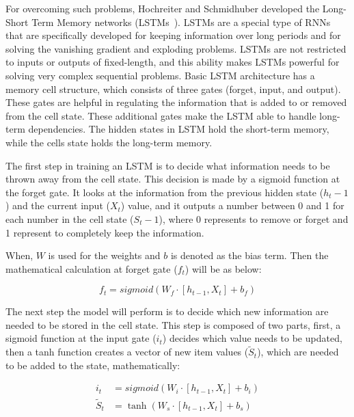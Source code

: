 For overcoming such problems, Hochreiter and Schmidhuber developed the Long-Short Term Memory networks (LSTMs~\cite{hochreiter1997long}).
LSTMs are a special type of RNNs that are specifically developed for keeping information over long periods and for solving the vanishing gradient and exploding problems.
LSTMs are not restricted to inputs or outputs of fixed-length, and this ability makes LSTMs powerful for solving very complex sequential problems. 
Basic LSTM architecture has a memory cell structure, which consists of three gates (forget, input, and output). 
These gates are helpful in regulating the information that is added to or removed from the cell state. These additional gates make the LSTM able to handle long-term dependencies. The hidden states in LSTM hold the short-term memory, while the cells state holds the long-term memory. 

The first step in training an LSTM is to decide what information needs to be thrown away from the cell state.
This decision is made by a sigmoid function at the forget gate.
It looks at the information from the previous hidden state ($h_t-1$) and the current input ($X_t$) value, and it outputs a number between 0 and 1 for each number in the cell state ($S_t-1$), where 0 represents to remove or forget and 1 represent to completely keep the information.

When, $W$ is used for the weights and $b$ is denoted as the bias term. 
Then the mathematical calculation at forget gate ($f_t$) will be as below:

\begin{equation}
f_{t}=sigmoid\left(W_{f} \cdot\left[h_{t-1}, X_{t}\right]+b_{f}\right)
\label{eq:eq1}
\end{equation}

The next step the model will perform is to decide which new information are needed to be stored in the cell state.
This step is composed of two parts, first, a sigmoid function at the input gate ($i_t$) decides which value needs to be updated, then a tanh function creates a vector of new item values ($\tilde{S}_{t}$), which are needed to be added to the state, mathematically:

\begin{equation}
\begin{aligned}
i_{t} &=sigmoid\left(W_{i} \cdot\left[h_{t-1}, X_{t}\right]+b_{i}\right) \\
\tilde{S}_{t} &=\tanh \left(W_{s} \cdot\left[h_{t-1}, X_{t}\right]+b_{s}\right)
\end{aligned} \label{eq:eq2}
\end{equation}

